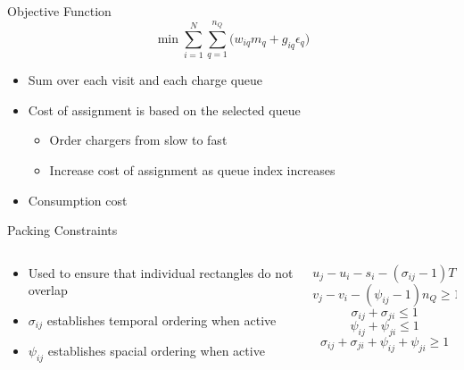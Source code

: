 \documentclass[bigger]{beamer}
\begin{document}
\begin{frame}[label={sec:orgeed0860}]{Objective Function}
\begin{equation*}
\label{eq:objective}
	\min \sum_{i=1}^N \sum_{q=1}^{n_Q} \Big( w_{iq} m_q + g_{iq} \epsilon_q \Big)
\end{equation*}

\begin{itemize}
\item Sum over each visit and each charge queue
\item Cost of assignment is based on the selected queue
\begin{itemize}
\item Order chargers from slow to fast
\item Increase cost of assignment as queue index increases
\end{itemize}
\item Consumption cost
\end{itemize}
\end{frame}

\begin{frame}[label={sec:orgd93039e}]{Packing Constraints}
\begin{columns}
\begin{column}{0.5\columnwidth}
\begin{itemize}
\item Used to ensure that individual rectangles do not overlap
\item \(\sigma_{ij}\) establishes temporal ordering when active
\item \(\psi_{ij}\) establishes spacial ordering when active
\end{itemize}
\end{column}

\begin{column}{0.5\columnwidth}
\begin{equation*}
    u_j - u_i - s_i - (\sigma_{ij} - 1)T \geq 0
\end{equation*}
\begin{equation*}
    v_j - v_i - (\psi_{ij} - 1)n_Q \geq 1
\end{equation*}
\begin{equation*}
    \sigma_{ij} + \sigma_{ji} \leq 1
\end{equation*}
\begin{equation*}
    \psi_{ij} + \psi_{ji} \leq 1
\end{equation*}
\begin{equation*}
    \sigma_{ij} + \sigma_{ji} + \psi_{ij} + \psi_{ji} \geq 1
\end{equation*}
\end{column}
\end{columns}
\end{frame}
\end{document}
